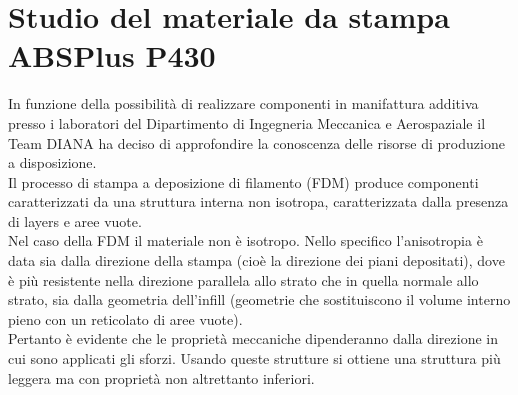 \documentclass[%
corpo=11pt,
twoside,
 stile=classica,
oldstyle,
greek,%
]{toptesi}
\begin{document}
	
	\section{Studio del materiale da stampa ABSPlus P430}
	In funzione della possibilità di realizzare componenti in manifattura additiva presso i laboratori  del Dipartimento di Ingegneria Meccanica e Aerospaziale il Team DIANA ha deciso di approfondire la conoscenza delle risorse di produzione a disposizione. \\
	Il processo di stampa a deposizione di filamento (FDM) produce componenti caratterizzati da una struttura interna non isotropa, caratterizzata dalla presenza di layers e aree vuote.\\ 
	Nel caso della FDM il materiale non è isotropo. Nello specifico l’anisotropia è data sia dalla direzione della stampa (cioè la direzione dei piani depositati), dove è più resistente nella direzione parallela allo strato che in quella normale allo strato, sia dalla geometria dell’infill (geometrie che sostituiscono il volume interno pieno con un reticolato di aree vuote).\\
	 Pertanto è evidente che le proprietà meccaniche dipenderanno dalla direzione in cui sono applicati gli sforzi. 
	 Usando queste strutture si ottiene una struttura più leggera ma con proprietà non altrettanto inferiori. 
	 
\end{document}
